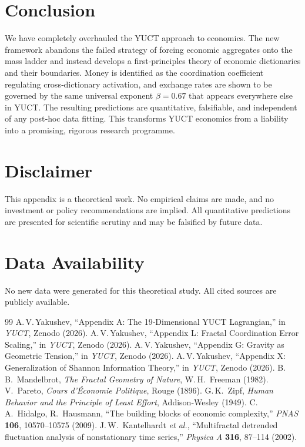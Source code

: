 \documentclass[12pt,a4paper]{article}
\theoremstyle{remark}
\begin{document}
	\section{Conclusion}
	
	We have completely overhauled the YUCT approach to economics. The new framework abandons the failed strategy of forcing economic aggregates onto the mass ladder and instead develops a first‑principles theory of economic dictionaries and their boundaries. Money is identified as the coordination coefficient regulating cross‑dictionary activation, and exchange rates are shown to be governed by the same universal exponent \(\beta = 0.67\) that appears everywhere else in YUCT. The resulting predictions are quantitative, falsifiable, and independent of any post‑hoc data fitting. This transforms YUCT economics from a liability into a promising, rigorous research programme.
	
	\section*{Disclaimer}
	
	This appendix is a theoretical work. No empirical claims are made, and no investment or policy recommendations are implied. All quantitative predictions are presented for scientific scrutiny and may be falsified by future data.
	
	\section*{Data Availability}
	
	No new data were generated for this theoretical study. All cited sources are publicly available.
	
	\begin{thebibliography}{99}
		 A.\,V.\,Yakushev, ``Appendix A: The 19‑Dimensional YUCT Lagrangian,'' in \emph{YUCT}, Zenodo (2026).
		 A.\,V.\,Yakushev, ``Appendix L: Fractal Coordination Error Scaling,'' in \emph{YUCT}, Zenodo (2026).
		 A.\,V.\,Yakushev, ``Appendix G: Gravity as Geometric Tension,'' in \emph{YUCT}, Zenodo (2026).
		 A.\,V.\,Yakushev, ``Appendix X: Generalization of Shannon Information Theory,'' in \emph{YUCT}, Zenodo (2026).
		 B.\,B.~Mandelbrot, \emph{The Fractal Geometry of Nature}, W.\,H.~Freeman (1982).
		 V.~Pareto, \emph{Cours d'Économie Politique}, Rouge (1896).
		 G.\,K.~Zipf, \emph{Human Behavior and the Principle of Least Effort}, Addison‑Wesley (1949).
		 C.\,A.~Hidalgo, R.~Hausmann, ``The building blocks of economic complexity,'' \emph{PNAS} \textbf{106}, 10570–10575 (2009).
		 J.\,W.~Kantelhardt \emph{et al.}, ``Multifractal detrended fluctuation analysis of nonstationary time series,'' \emph{Physica A} \textbf{316}, 87–114 (2002).
	\end{thebibliography}
	
\end{document}
